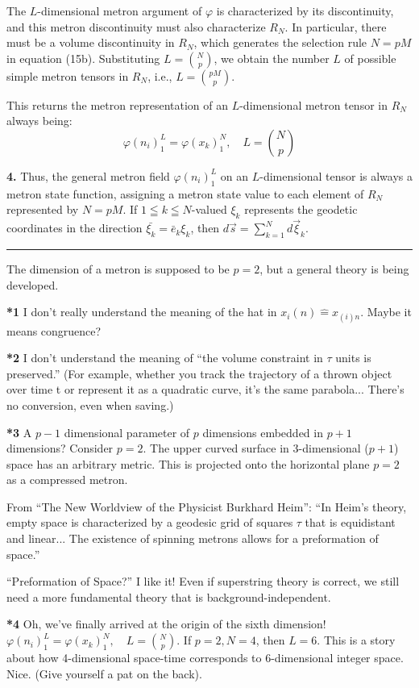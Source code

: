 \documentclass[11pt,a4paper,oneside]{article}
\newcommand{\hr}{\par\vspace{2em}\noindent\rule{\linewidth}{0.4pt}\par\vspace{2em}}
\begin{document}
The $L$-dimensional metron argument of $\varphi$ is characterized by its discontinuity, and this metron discontinuity must also characterize $R_N$. In particular, there must be a volume discontinuity in $R_N$, which generates the selection rule $N = pM$ in equation (15b). Substituting $L = \binom {N}{p}$, we obtain the number $L$ of possible simple metron tensors in $R_N$, i.e., $L = \binom {pM}{p}$.

This returns the metron representation of an $L$-dimensional metron tensor in $R_N$ always being:
\begin{equation}
    \varphi(n_i)^L_1 = \varphi(x_k)^N_1,\quad L = \binom {N}{p} \tag{M15}
\end{equation}

\textbf{4.} Thus, the general metron field $\varphi(n_i)^L_1$ on an $L$-dimensional tensor is always a metron state function, assigning a metron state value to each element of $R_N$ represented by $N = pM$. If $1 \leqq k \leqq N$-valued $\xi_k$ represents the geodetic coordinates in the direction $\bar{\xi_k} = \bar{e}_k \xi_k$, then $d \vec {s} = \sum_{k = 1}^N d \vec {\xi}_k$.

\hr

\begin{reflectionbox}[title={Chat / Notes}]
    The dimension of a metron is supposed to be $p=2$, but a general theory is being developed.
    
    \textbf{*1} I don't really understand the meaning of the hat in $x_i(n) \hat{=} x_{(i)n}$. Maybe it means congruence?
    
    \textbf{*2} I don't understand the meaning of ``the volume constraint in $\tau$ units is preserved.'' (For example, whether you track the trajectory of a thrown object over time t or represent it as a quadratic curve, it's the same parabola... There's no conversion, even when saving.)
    
    \textbf{*3} A $p-1$ dimensional parameter of $p$ dimensions embedded in $p+1$ dimensions? Consider $p=2$. The upper curved surface in 3-dimensional ($p+1$) space has an arbitrary metric. This is projected onto the horizontal plane $p=2$ as a compressed metron.
    
    From ``The New Worldview of the Physicist Burkhard Heim'':
    ``In Heim's theory, empty space is characterized by a geodesic grid of squares $\tau$ that is equidistant and linear... The existence of spinning metrons allows for a preformation of space.''
    
    ``Preformation of Space?'' I like it! Even if superstring theory is correct, we still need a more fundamental theory that is background-independent.
    
    \textbf{*4} Oh, we've finally arrived at the origin of the sixth dimension!
    $\varphi(n_i)^L_1 = \varphi(x_k)^N_1,\quad L = \binom {N}{p}$.
    If $p=2, N=4$, then $L=6$. This is a story about how 4-dimensional space-time corresponds to 6-dimensional integer space. Nice. (Give yourself a pat on the back).
\end{reflectionbox}
\end{document}

